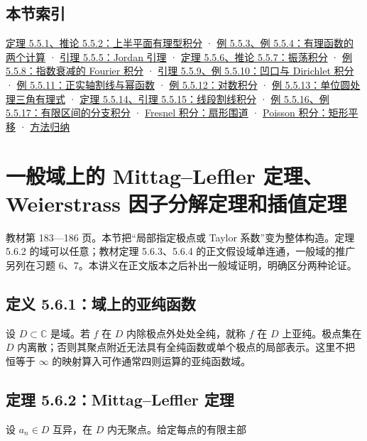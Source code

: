\documentclass[11pt,a4paper]{article}
\begin{document}
\subsection{本节索引}\label{ch05-s5-heading-15}

\hyperref[ch05-s5-heading-1]{定理 5.5.1、推论 5.5.2：上半平面有理型积分} ·
\hyperref[ch05-s5-heading-2]{例 5.5.3、例 5.5.4：有理函数的两个计算} ·
\hyperref[ch05-s5-heading-3]{引理 5.5.5：Jordan 引理} ·
\hyperref[ch05-s5-heading-4]{定理 5.5.6、推论 5.5.7：振荡积分} ·
\hyperref[ch05-s5-heading-5]{例 5.5.8：指数衰减的 Fourier 积分} ·
\hyperref[ch05-s5-heading-6]{引理 5.5.9、例 5.5.10：凹口与 Dirichlet 积分} ·
\hyperref[ch05-s5-heading-7]{例 5.5.11：正实轴割线与幂函数} ·
\hyperref[ch05-s5-heading-8]{例 5.5.12：对数积分} · \hyperref[ch05-s5-heading-9]{例
5.5.13：单位圆处理三角有理式} · \hyperref[ch05-s5-heading-10]{定理 5.5.14、引理
5.5.15：线段割线积分} · \hyperref[ch05-s5-heading-11]{例 5.5.16、例
5.5.17：有限区间的分支积分} · \hyperref[ch05-s5-heading-12]{Fresnel
积分：扇形围道} · \hyperref[ch05-s5-heading-13]{Poisson 积分：矩形平移} ·
\hyperref[ch05-s5-heading-14]{方法归纳}

\section{一般域上的 Mittag–Leffler 定理、Weierstrass 因子分解定理和插值定理}
教材第 183---186 页。本节把``局部指定极点或 Taylor
系数''变为整体构造。定理 5.6.2 的域可以任意；教材定理 5.6.3、5.6.4
的正文假设域单连通，一般域的推广另列在习题
6、7。本讲义在正文版本之后补出一般域证明，明确区分两种论证。

\subsection{定义 5.6.1：域上的亚纯函数}\label{ch05-s6-heading-1}

设 \(D\subset\mathbb C\) 是域。若 \(f\) 在 \(D\)
内除极点外处处全纯，就称 \(f\) 在 \(D\) 上亚纯。极点集在 \(D\)
内离散；否则其聚点附近无法具有全纯函数或单个极点的局部表示。这里不把恒等于
\(\infty\) 的映射算入可作通常四则运算的亚纯函数域。

\subsection{定理 5.6.2：Mittag--Leffler 定理}\label{ch05-s6-heading-2}

设 \(a_n\in D\) 互异，在 \(D\) 内无聚点。给定每点的有限主部
\end{document}
